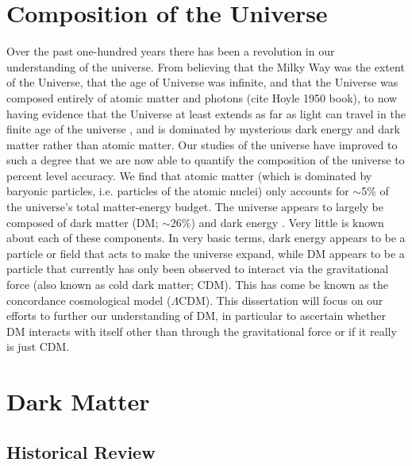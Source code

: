\label{chapter:1}

\section{Composition of the Universe}\label{section:CompositionOfTheUniverse}

Over the past one-hundred years there has been a revolution in our understanding of the universe.
From believing that the Milky Way was the extent of the Universe, that the age of Universe was infinite, and that the Universe was composed entirely of atomic matter and photons (cite Hoyle 1950 book),
to now having evidence that the Universe at least extends as far as light can travel in the finite age of the universe \citep[$13.817\pm0.048$;][]{Collaboration:2013uv}, and is dominated by mysterious dark energy and dark matter rather than atomic matter.
Our studies of the universe have improved to such a degree that we are now able to quantify the composition of the universe to percent level accuracy. 
We find that atomic matter (which is dominated by baryonic particles, i.e. particles of the atomic nuclei) only accounts for $\sim$5\% of the universe's total matter-energy budget.
The universe appears to largely be composed of dark matter (DM; $\sim$26\%) and dark energy \citep[$\sim$69\%; see][for more accurate values]{Collaboration:2013uv}.
Very little is known about each of these components.
In very basic terms, dark energy appears to be a particle or field that acts to make the universe expand, while DM appears to be a particle that currently has only been observed to interact via the gravitational force (also known as cold dark matter; CDM).
This has come be known as the concordance cosmological model ($\Lambda$CDM).
This dissertation will focus on our efforts to further our understanding of DM, in particular to ascertain whether DM interacts with itself other than through the gravitational force or if it really is just CDM.

\section{Dark Matter}

\subsection{Historical Review}\label{section:DMhistory}


